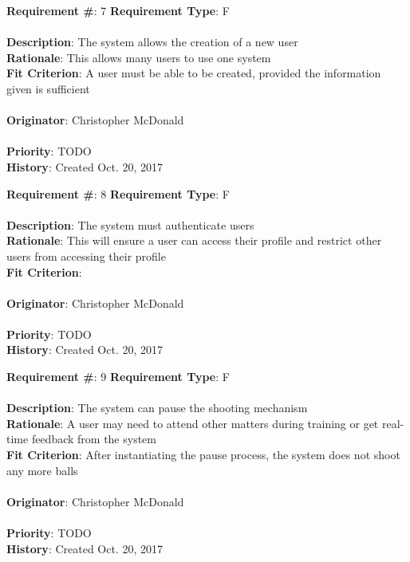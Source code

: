 \documentclass[11pt]{article}
\begin{document}
\begin{framed}
	\noindent\textbf{Requirement \#}: 7 \hfill \textbf{Requirement Type}: F \hfill\\\\
	\noindent\textbf{Description}: The system allows the creation of a new user \\
	\textbf{Rationale}: This allows many users to use one system \\
	\textbf{Fit Criterion}: A user must be able to be created, provided the information given is sufficient \\\\
	\textbf{Originator}: Christopher McDonald \\\\
	\textbf{Priority}: TODO \hfill \\
	\noindent\textbf{History}: Created Oct. 20, 2017
\end{framed}

\begin{framed}
	\noindent\textbf{Requirement \#}: 8 \hfill \textbf{Requirement Type}: F \hfill\\\\
	\noindent\textbf{Description}: The system must authenticate users \\
	\textbf{Rationale}: This will ensure a user can access their profile and restrict other users from accessing their profile \\
	\textbf{Fit Criterion}: \\\\
	\textbf{Originator}: Christopher McDonald \\\\
	\textbf{Priority}: TODO \hfill \\
	\noindent\textbf{History}: Created Oct. 20, 2017
\end{framed}

\begin{framed}
	\noindent\textbf{Requirement \#}: 9 \hfill \textbf{Requirement Type}: F \hfill\\\\
	\noindent\textbf{Description}: The system can pause the shooting mechanism \\
	\textbf{Rationale}: A user may need to attend other matters during training or get real-time feedback from the system \\
	\textbf{Fit Criterion}: After instantiating the pause process, the system does not shoot any more balls \\\\
	\textbf{Originator}: Christopher McDonald \\\\
	\textbf{Priority}: TODO \hfill \\
	\noindent\textbf{History}: Created Oct. 20, 2017
\end{framed}
\end{document}
